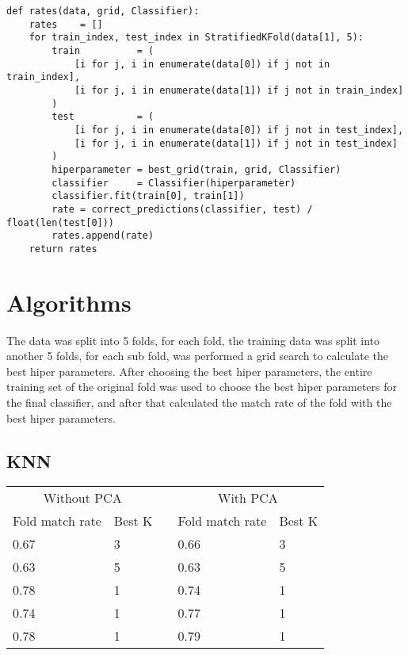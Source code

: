 \documentclass{article}
\begin{document}
\begin{lstlisting}
def rates(data, grid, Classifier):
    rates    = []
    for train_index, test_index in StratifiedKFold(data[1], 5):
        train          = (
            [i for j, i in enumerate(data[0]) if j not in train_index],
            [i for j, i in enumerate(data[1]) if j not in train_index]
        )
        test           = (
            [i for j, i in enumerate(data[0]) if j not in test_index],
            [i for j, i in enumerate(data[1]) if j not in test_index]
        )
        hiperparameter = best_grid(train, grid, Classifier)
        classifier     = Classifier(hiperparameter)
        classifier.fit(train[0], train[1])
        rate = correct_predictions(classifier, test) / float(len(test[0]))
        rates.append(rate)
    return rates
\end{lstlisting}

\section{Algorithms}
The data was split into 5 folds, for each fold, the training data was split into another 5 folds, for each sub fold, was performed a grid search to calculate the best hiper parameters. After choosing the best hiper parameters, the entire training set of the original fold was used to choose the best hiper parameters for the final classifier, and after that calculated the match rate of the fold with the best hiper parameters.

\subsection{KNN}

\begin{table}[h]
    \begin{tabular}{|l|l|l|l|l|}
    \cline{1-2} \cline{4-5}
    \multicolumn{2}{|c|}{Without PCA} &  & \multicolumn{2}{|c|}{With PCA} \\ \cline{1-2} \cline{4-5}
    Fold match rate & Best K &  & Fold match rate & Best K  \\ \cline{1-2} \cline{4-5}
    0.67 & 3 &  & 0.66 & 3  \\ \cline{1-2} \cline{4-5}
    0.63 & 5 &  & 0.63 & 5  \\ \cline{1-2} \cline{4-5}
    0.78 & 1 &  & 0.74 & 1  \\ \cline{1-2} \cline{4-5}
    0.74 & 1 &  & 0.77 & 1  \\ \cline{1-2} \cline{4-5}
    0.78 & 1 &  & 0.79 & 1  \\ \cline{1-2} \cline{4-5}
    \end{tabular}
\end{table}
\end{document}
